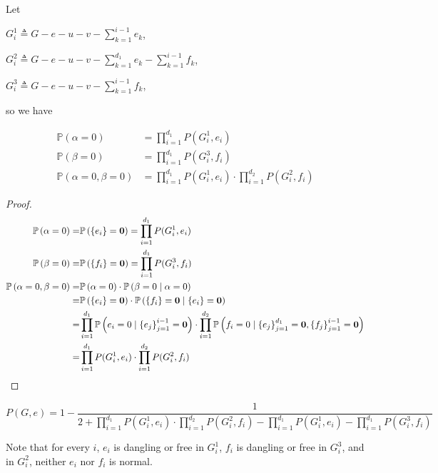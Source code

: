 Let

$G_i^1 \triangleq G - e - u - v - \sum_{k=1}^{i-1} e_k$,

$G_i^2 \triangleq G-e-u-v - \sum_{k=1}^{d_1}e_k - \sum_{k=1}^{i-1} f_k$,

$G_i^3 \triangleq G - e - u - v - \sum_{k=1}^{i-1} f_k$,

so we have

\begin{Prop}
	\begin{align*}
		\mathbb{P}\left( \alpha = 0\right) &= \prod_{i=1}^{d_1} P(G_i^1, e_i) \\
		\mathbb{P}\left( \beta = 0\right) &= \prod_{i=1}^{d_1} P(G_i^3, f_i) \\
		\mathbb{P}\left( \alpha = 0, \beta = 0 \right) &= \prod_{i=1}^{d_1} P(G_i^1, e_i) \cdot \prod_{i=1}^{d_2} P(G_i^2, f_i)
	\end{align*}
\end{Prop}

\begin{proof}
	\begin{align*}
		\mathbb{P}\left( \alpha = 0\right) =&\mathbb{P} \left( \left\{e_i\right\} = \mathbf{0}\right) =	\prod_{i=1}^{d_1} P(G_i^1, e_i) \\
		\mathbb{P}\left( \beta = 0\right) =&\mathbb{P} \left( \left\{f_i\right\} = \mathbf{0}\right) =	\prod_{i=1}^{d_1} P(G_i^3, f_i) \\
		\mathbb{P}\left( \alpha = 0, \beta = 0 \right) =& \mathbb{P} \left( \alpha = 0 \right) \cdot \mathbb{P}\left( \beta = 0 \mid \alpha = 0 \right) \\
		=& \mathbb{P} \left( \left\{e_i\right\} = \mathbf{0}\right) \cdot \mathbb{P} \left( \left\{f_i\right\} = \mathbf{0} \mid \left\{e_i\right\} = \mathbf{0} \right) \\
=&\prod_{i=1}^{d_1} \mathbb{P} \left( e_i = 0 \mid \left\{e_j\right\}_{j=1}^{i-1} = \mathbf{0} \right) \cdot \prod_{i=1}^{d_2} \mathbb{P} \left( f_i = 0 \mid \left\{e_j\right\}_{j=1}^{d_1} = \mathbf{0},\left\{f_j\right\}_{j=1}^{i-1} = \mathbf{0} \right) \\
=& \prod_{i=1}^{d_1} P(G_i^1, e_i) \cdot \prod_{i=1}^{d_2} P(G_i^2, f_i)
	\end{align*}
\end{proof}

\begin{Cor}
	\[P(G,e) =  1 - \frac{1}{2 + \prod_{i=1}^{d_1} P(G_i^1, e_i) \cdot \prod_{i=1}^{d_2} P(G_i^2, f_i) - \prod_{i=1}^{d_1} P(G_i^1, e_i) - \prod_{i=1}^{d_1} P(G_i^3, f_i)}\]
\end{Cor}

Note that for every $i$, $e_i$ is dangling or free in $G_i^1$, $f_i$ is dangling or free in $G_i^3$, and in $G_i^2$, neither $e_i$ nor $f_i$ is normal.



